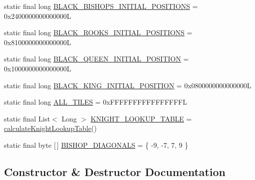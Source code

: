 \begin{DoxyCompactItemize}
\item 
static final long \mbox{\hyperlink{classcom_1_1chess_1_1engine_1_1bitboards_1_1_bit_board_v2_a08853c515869bc8b750b779fcd815ea9}{B\+L\+A\+C\+K\+\_\+\+B\+I\+S\+H\+O\+P\+S\+\_\+\+I\+N\+I\+T\+I\+A\+L\+\_\+\+P\+O\+S\+I\+T\+I\+O\+NS}} = 0x2400000000000000L
\item 
static final long \mbox{\hyperlink{classcom_1_1chess_1_1engine_1_1bitboards_1_1_bit_board_v2_a43e4f241ecea3982aba0b412f340f206}{B\+L\+A\+C\+K\+\_\+\+R\+O\+O\+K\+S\+\_\+\+I\+N\+I\+T\+I\+A\+L\+\_\+\+P\+O\+S\+I\+T\+I\+O\+NS}} = 0x8100000000000000L
\item 
static final long \mbox{\hyperlink{classcom_1_1chess_1_1engine_1_1bitboards_1_1_bit_board_v2_a0b5f46e99575b5ac439c6d35b808974e}{B\+L\+A\+C\+K\+\_\+\+Q\+U\+E\+E\+N\+\_\+\+I\+N\+I\+T\+I\+A\+L\+\_\+\+P\+O\+S\+I\+T\+I\+ON}} = 0x1000000000000000L
\item 
static final long \mbox{\hyperlink{classcom_1_1chess_1_1engine_1_1bitboards_1_1_bit_board_v2_ad70762e8549f01950839052042133dd5}{B\+L\+A\+C\+K\+\_\+\+K\+I\+N\+G\+\_\+\+I\+N\+I\+T\+I\+A\+L\+\_\+\+P\+O\+S\+I\+T\+I\+ON}} = 0x0800000000000000L
\item 
static final long \mbox{\hyperlink{classcom_1_1chess_1_1engine_1_1bitboards_1_1_bit_board_v2_acb847a060f8c40bc49454c25ae759852}{A\+L\+L\+\_\+\+T\+I\+L\+ES}} = 0x\+F\+F\+F\+F\+F\+F\+F\+F\+F\+F\+F\+F\+F\+F\+F\+FL
\item 
static final List$<$ Long $>$ \mbox{\hyperlink{classcom_1_1chess_1_1engine_1_1bitboards_1_1_bit_board_v2_a98902a8de666c385ab4be92a51962146}{K\+N\+I\+G\+H\+T\+\_\+\+L\+O\+O\+K\+U\+P\+\_\+\+T\+A\+B\+LE}} = \mbox{\hyperlink{classcom_1_1chess_1_1engine_1_1bitboards_1_1_bit_board_v2_a53df35e5088404ff0b13a68e8c0c2cd5}{calculate\+Knight\+Lookup\+Table}}()
\item 
static final byte \mbox{[}$\,$\mbox{]} \mbox{\hyperlink{classcom_1_1chess_1_1engine_1_1bitboards_1_1_bit_board_v2_a8d0d0e1b8218adc0432c0817e22120ef}{B\+I\+S\+H\+O\+P\+\_\+\+D\+I\+A\+G\+O\+N\+A\+LS}} = \{ -\/9, -\/7, 7, 9 \}
\end{DoxyCompactItemize}


\subsection{Constructor \& Destructor Documentation}
\mbox{\label{classcom_1_1chess_1_1engine_1_1bitboards_1_1_bit_board_v2_a2aee3d33c2ab506bd5b6524fde31f89d}} 
